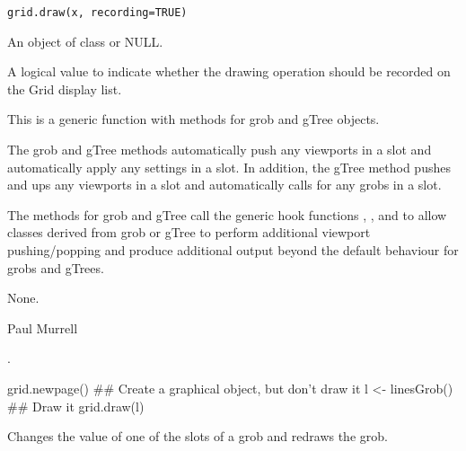 %
\begin{Usage}
\begin{verbatim}
grid.draw(x, recording=TRUE)
\end{verbatim}
\end{Usage}
%
\begin{Arguments}
\begin{ldescription}
\item[\code{x}] An object of class  or NULL.
\item[\code{recording}] A logical value to indicate whether the drawing
operation should be recorded on the Grid display list.
\end{ldescription}
\end{Arguments}
%
\begin{Details}\relax
This is a generic function with methods for grob and gTree objects.

The grob and gTree methods automatically push any viewports in a
 slot and automatically apply any  settings
in a  slot.  In addition, the gTree method pushes and
ups any viewports in a  slot and automatically
calls  for any grobs in a  slot.

The methods for grob and gTree call the generic hook functions
, , and 
to allow classes derived from grob or gTree to perform
additional viewport pushing/popping and produce additional
output beyond the default behaviour for grobs and gTrees.
\end{Details}
%
\begin{Value}
None.
\end{Value}
%
\begin{Author}\relax
Paul Murrell
\end{Author}
%
\begin{SeeAlso}\relax
{}.
\end{SeeAlso}
%
\begin{Examples}
\begin{ExampleCode}
grid.newpage()
## Create a graphical object, but don't draw it
l <- linesGrob()
## Draw it
grid.draw(l)
\end{ExampleCode}
\end{Examples}
%
\begin{Description}\relax
Changes the value of one of the slots of a grob
and redraws the grob.
\end{Description}
